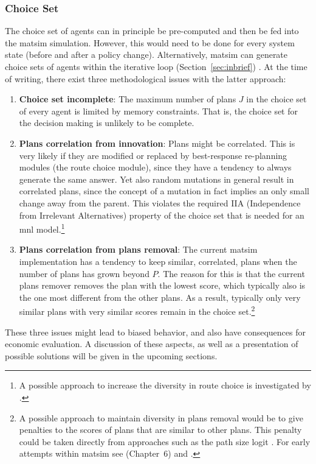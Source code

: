 \begin{oframed}
\subsubsection{Choice Set}
The choice set of agents can in principle be pre-computed and then be fed into the \acrshort{matsim} simulation. However, this would need to be done for every system state (\eg before and after a policy change).
%
Alternatively, \acrshort{matsim} can generate choice sets of agents within the iterative loop (Section~\ref{sec:inbrief})
%
%
. At the time of writing, there exist three methodological issues with the latter approach:
%
\begin{enumerate}\styleEnumerate
\item \textbf{Choice set incomplete}: The maximum number of plans $J$ in the choice set of every agent is limited by memory constraints. That is, the choice set for the decision making is unlikely to be complete.
%
\item \textbf{Plans correlation from innovation}: Plans might be correlated. This is very likely if they are modified or replaced by best-response re-planning modules (\eg the route choice module), since they have a tendency to always generate the same answer. Yet also random mutations in general result in correlated plans, since the concept of a mutation in fact implies an only small change away from the parent.  This violates the required IIA (Independence from Irrelevant Alternatives) 
property of the choice set that is needed for an \gls{mnl} 
model.\footnote{%
%
A possible approach to increase the diversity in route choice is investigated by \citet{NagelKickhoeferJoubert2014HeterogeneousVoTsPROCEDIA}.
%
}

\item \textbf{Plans correlation from plans removal}: The current \acrshort{matsim} implementation has a tendency to keep similar, \ie  correlated, plans when the number of plans has grown beyond $P$.  The reason for this is that the current plans remover removes the plan with the lowest score, which typically also is the one most different from the other plans.  As a result, typically only very similar plans with very similar scores remain in the choice set.\footnote{%
%
A possible approach to maintain diversity in plans removal would be to give penalties to the scores of plans that are similar to other plans.  This penalty could be taken directly from approaches such as the path size logit \citep{DaganzoSheffi1977SUE,FrejingerBierlaire2007PathSizeLogit}.  For early attempts within \acrshort{matsim} see \cite{Grether2014PhD} (Chapter~6) and \cite{NeumannEtAlPassengerArrivalPatterns}.
%
}
%
\end{enumerate}
%
These three issues might lead to biased behavior, and also have consequences for economic evaluation. A discussion of these aspects, as well as a presentation of possible solutions will be given in the upcoming sections.
%
\end{oframed}

